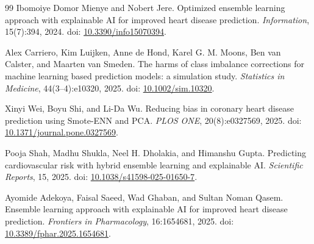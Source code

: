 \begin{thebibliography}{99}
 Ibomoiye Domor Mienye and Nobert Jere. Optimized ensemble learning approach with explainable AI for improved heart disease prediction. \emph{Information}, 15(7):394, 2024. doi: \href{https://doi.org/10.3390/info15070394}{10.3390/info15070394}.

 Alex Carriero, Kim Luijken, Anne de Hond, Karel G. M. Moons, Ben van Calster, and Maarten van Smeden. The harms of class imbalance corrections for machine learning based prediction models: a simulation study. \emph{Statistics in Medicine}, 44(3--4):e10320, 2025. doi: \href{https://doi.org/10.1002/sim.10320}{10.1002/sim.10320}.

 Xinyi Wei, Boyu Shi, and Li-Da Wu. Reducing bias in coronary heart disease prediction using Smote-ENN and PCA. \emph{PLOS ONE}, 20(8):e0327569, 2025. doi: \href{https://doi.org/10.1371/journal.pone.0327569}{10.1371/journal.pone.0327569}.

 Pooja Shah, Madhu Shukla, Neel H. Dholakia, and Himanshu Gupta. Predicting cardiovascular risk with hybrid ensemble learning and explainable AI. \emph{Scientific Reports}, 15, 2025. doi: \href{https://doi.org/10.1038/s41598-025-01650-7}{10.1038/s41598-025-01650-7}.

 Ayomide Adekoya, Faisal Saeed, Wad Ghaban, and Sultan Noman Qasem. Ensemble learning approach with explainable AI for improved heart disease prediction. \emph{Frontiers in Pharmacology}, 16:1654681, 2025. doi: \href{https://doi.org/10.3389/fphar.2025.1654681}{10.3389/fphar.2025.1654681}.

\end{thebibliography}
